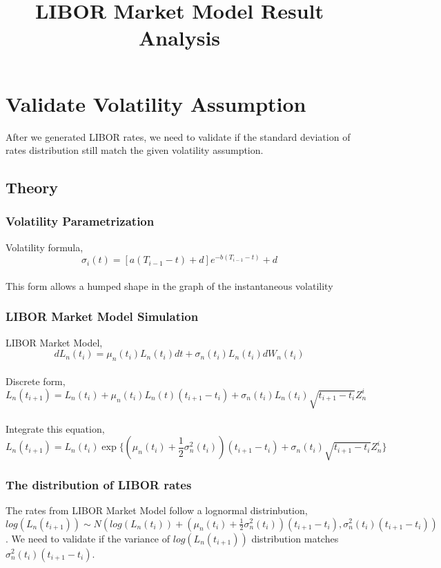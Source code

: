 \documentclass[12pt]{article}
\title{LIBOR Market Model Result Analysis}
\begin{document}
\maketitle


\section{Validate Volatility Assumption}

After we generated LIBOR rates, we need to validate if the standard deviation of rates distribution still match the given volatility assumption.

\subsection{Theory}

\subsubsection{Volatility Parametrization}
Volatility formula, 
\begin{equation}
    \sigma_i(t) = [a(T_{i-1}-t)+d]e^{-b(T_{i-1}-t)}+d
\end{equation}
\\
This form allows a humped shape in the graph of the instantaneous volatility

\subsubsection{LIBOR Market Model Simulation}
LIBOR Market Model,
\begin{equation}
    dL_n(t_i)=\mu_n(t_i) L_n(t_i)dt+\sigma_n(t_i)L_n(t_i)dW_n(t_i)
\end{equation}
\\
Discrete form,
\begin{equation}
    L_n(t_{i+1})=L_n(t_i)+\mu_n(t_i) L_n(t)(t_{i+1}-t_i)+\sigma_n(t_i) L_n(t_i) \sqrt{t_{i+1}-t_i}Z^i_n
\end{equation}
\\
Integrate this equation, 
\begin{equation}
    L_n(t_{i+1})=L_n(t_i)
    \exp{\{(\mu_n(t_i)+\frac{1}{2}\sigma^2_n(t_i))(t_{i+1}-t_i)+\sigma_n(t_i) \sqrt{t_{i+1}-t_i}Z^i_n\}} 
\end{equation}


\subsubsection{The distribution of LIBOR rates}
The rates from LIBOR Market Model follow a lognormal distrinbution,
$
    log(L_n(t_{i+1})) \sim N\left( log(L_n(t_{i}))+(\mu_n(t_i)+\frac{1}{2}\sigma^2_n(t_i))(t_{i+1}-t_i),
    \sigma^2_n(t_i) (t_{i+1}-t_i)        \right)
$.
We need to validate if the variance of $log(L_n(t_{i+1}))$ distribution matches $\sigma^2_n(t_i) (t_{i+1}-t_i)$.
\end{document}
